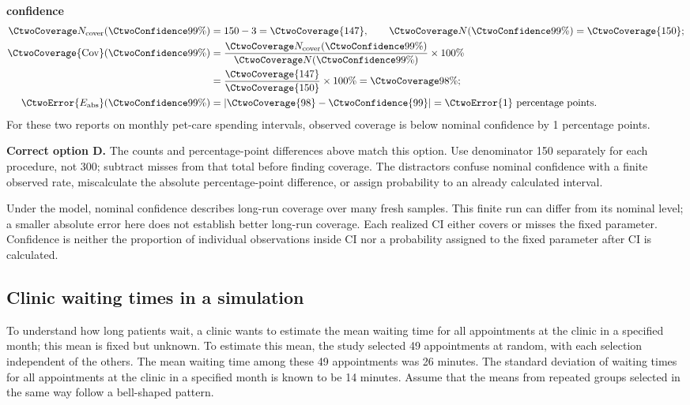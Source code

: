 \textbf{ confidence}\nopagebreak[4]
\begin{align*}
\CtwoCoverCount(\CtwoConfidence{99\%})&=150-3=\CtwoCoverage{147},
\qquad\CtwoTotalCount(\CtwoConfidence{99\%})=\CtwoCoverage{150};\\
\CtwoCoverage{\mathrm{Cov}}(\CtwoConfidence{99\%})
&=\frac{\CtwoCoverCount(\CtwoConfidence{99\%})}{\CtwoTotalCount(\CtwoConfidence{99\%})}\times100\%
\\
&=\frac{\CtwoCoverage{147}}{\CtwoCoverage{150}}\times100\%=\CtwoCoverage{98\%};\\
\CtwoError{E_{\rm abs}}(\CtwoConfidence{99\%})
&=\left|\CtwoCoverage{98}-\CtwoConfidence{99}\right|=\CtwoError{1}\ \text{percentage points}.
\end{align*}
For these two reports on monthly pet-care spending intervals, observed coverage is below nominal confidence by 1 percentage points.

\textbf{Correct option D.} The counts and percentage-point differences above match this option. Use denominator 150 separately for each procedure, not 300; subtract misses from that total before finding coverage. The distractors confuse nominal confidence with a finite observed rate, miscalculate the absolute percentage-point difference, or assign probability to an already calculated interval.

Under the model, nominal confidence describes long-run coverage over many fresh samples. This finite run can differ from its nominal level; a smaller absolute error here does not establish better long-run coverage. Each realized $\mathrm{CI}$ either covers or misses the fixed parameter. Confidence is neither the proportion of individual observations inside $\mathrm{CI}$ nor a probability assigned to the fixed parameter after $\mathrm{CI}$ is calculated.
\par\nopagebreak[4]
\par\vspace{3mm}
\clearpage
\subsection{Clinic waiting times in a simulation}
\label{prob:c2-3}

To understand how long patients wait, a clinic wants to estimate the mean waiting time for all appointments at the clinic in a specified month; this mean is fixed but unknown. To estimate this mean, the study selected 49 appointments at random, with each selection independent of the others. The mean waiting time among these 49 appointments was 26 minutes. The standard deviation of waiting times for all appointments at the clinic in a specified month is known to be 14 minutes. Assume that the means from repeated groups selected in the same way follow a bell-shaped pattern.

